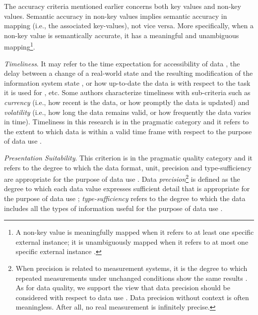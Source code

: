 The accuracy criteria mentioned earlier concerns both key values and non-key values. Semantic accuracy in non-key values implies semantic accuracy in mapping (i.e., the associated key-values), not vice versa.
More specifically, when a non-key value is semantically accurate, it has a meaningful and unambiguous mapping\footnote{A non-key value is meaningfully mapped when it refers to at least one specific external instance; it is unambiguously mapped when it refers to at most one specific external instance \citep{Price2005}.}. 


\textit{Timeliness}. 
It may refer to the time expectation for accessibility of data \citep[e.g.,][]{Loshin2011}, the delay between a change of a real-world state and the resulting modification of the information system state \citep[e.g.,][]{Wand1996}, or how up-to-date the data is with respect to the task it is used for \citep[e.g.,][]{Wang1996,Pipino2002}, etc.
Some authors \citep[e.g.,][]{Fox1994,Catarci2002,Bovee2003,Batini2006,Batini2009} characterize timeliness with sub-criteria such as \emph{currency} (i.e., how recent is the data, or how promptly the data is updated) and \emph{volatility} (i.e., how long the data remains valid, or how frequently the data varies in time). Timeliness in this research is in the pragmatic category and it refers to the extent to which data is within a valid time frame with respect to the purpose of data use \citep{Price2005}.   

\textit{Presentation Suitability}. 
This criterion is in the pragmatic quality category and it refers to the degree to which the data format, unit, precision and type-sufficiency are appropriate for the purpose of data use %
\citep{Price2005,McGilvray2008}. %
Data \textit{precision}\footnote{When precision is related to measurement systems, it is the degree to which repeated measurements under unchanged conditions show the same results \citep{Taylor1999}. As for data quality, we support the view that data precision should be considered with respect to data use \citep{Fox1994, Levitin1995,Price2005}. Data precision without context is often meaningless. After all, no real measurement is infinitely precise.} is defined as the degree to which each data value expresses sufficient detail that is appropriate for the purpose of data use \citep{Pipino2002,Price2005}; \textit{type-sufficiency} refers to the degree to which the data includes all the types of information useful for the purpose of data use \citep{Price2005}. 

